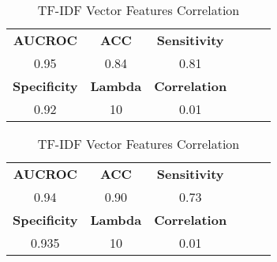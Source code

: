 \documentclass[12pt]{article}
\begin{document}
\begin{table}[hbtp]
  {\begin{tabular}{ccc|ccc}
    \toprule 
    
    \bfseries AUCROC & \bfseries ACC  & \bfseries Sensitivity \\ 
    0.95 & 0.84 & 0.81  \\
    \toprule 
    
    \bfseries Specificity & \bfseries Lambda & \bfseries Correlation \\
    0.92 & 10 & 0.01 \\
    
    \bottomrule
  \end{tabular}}
  {\caption{TF-IDF Vector Features Correlation}}
\end{table}

\begin{table}[hbtp]
  {\begin{tabular}{ccc|ccc}
    \toprule 
    
    \bfseries AUCROC & \bfseries ACC  & \bfseries Sensitivity \\ 
    0.94 & 0.90 & 0.73  \\
    \toprule 
    
    \bfseries Specificity & \bfseries Lambda & \bfseries Correlation \\
    0.935 & 10 & 0.01 \\
    
    \bottomrule
  \end{tabular}}
  {\caption{TF-IDF Vector Features Correlation}}
\end{table}
\end{document}
